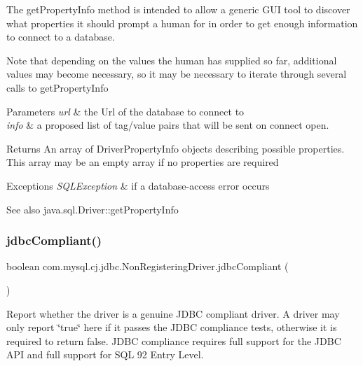 The get\+Property\+Info method is intended to allow a generic G\+UI tool to discover what properties it should prompt a human for in order to get enough information to connect to a database.

Note that depending on the values the human has supplied so far, additional values may become necessary, so it may be necessary to iterate through several calls to get\+Property\+Info 


\begin{DoxyParams}{Parameters}
{\em url} & the Url of the database to connect to \\
\hline
{\em info} & a proposed list of tag/value pairs that will be sent on connect open.\\
\hline
\end{DoxyParams}
\begin{DoxyReturn}{Returns}
An array of Driver\+Property\+Info objects describing possible properties. This array may be an empty array if no properties are required
\end{DoxyReturn}

\begin{DoxyExceptions}{Exceptions}
{\em S\+Q\+L\+Exception} & if a database-\/access error occurs\\
\hline
\end{DoxyExceptions}
\begin{DoxySeeAlso}{See also}
java.\+sql.\+Driver\+::get\+Property\+Info 
\end{DoxySeeAlso}
\mbox{\label{classcom_1_1mysql_1_1cj_1_1jdbc_1_1_non_registering_driver_a7957fc641b984cf8d56938949be1069d}} 
\subsubsection{\texorpdfstring{jdbc\+Compliant()}{jdbcCompliant()}}
{\footnotesize\ttfamily boolean com.\+mysql.\+cj.\+jdbc.\+Non\+Registering\+Driver.\+jdbc\+Compliant (\begin{DoxyParamCaption}{ }\end{DoxyParamCaption})}

Report whether the driver is a genuine J\+D\+BC compliant driver. A driver may only report \char`\"{}true\char`\"{} here if it passes the J\+D\+BC compliance tests, otherwise it is required to return false. J\+D\+BC compliance requires full support for the J\+D\+BC A\+PI and full support for S\+QL 92 Entry Level.

